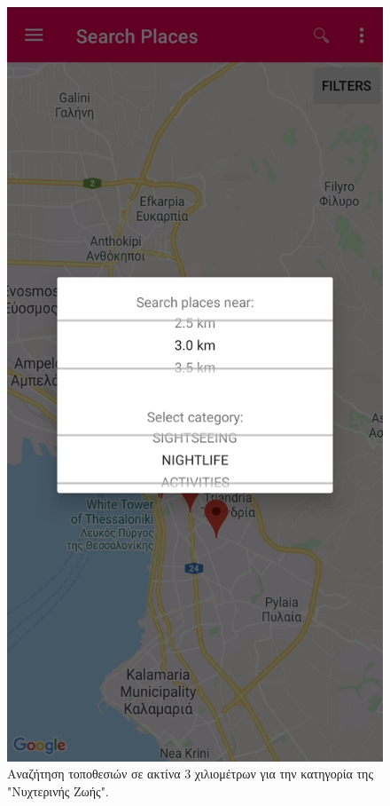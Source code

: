 \documentclass[oneside, 12pt]{book}
\begin{document}
\begin{figure}[h]
  \centering
  \includegraphics[scale=0.15]{images/search_places.jpg}
  \caption{\label{fig:search_places_1}Αναζήτηση τοποθεσιών σε ακτίνα 3 χιλιομέτρων για την κατηγορία της "Νυχτερινής Ζωής".}
\end{figure}
\end{document}

